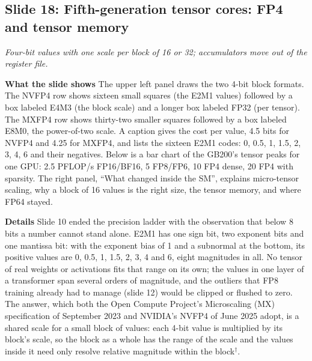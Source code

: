 \documentclass[11pt,letterpaper]{article}
\newcommand{\slide}[3]{%
  \subsection[Slide #1: #2]{Slide #1: #2}%
  {\color{muted}\itshape #3\par}\medskip}
\newcommand{\para}[1]{\medskip\noindent\textbf{#1}\quad}
\begin{document}

\slide{18}{Fifth-generation tensor cores: FP4 and tensor memory}{Four-bit values with one scale per block of 16 or 32; accumulators move out of the register file.}

\para{What the slide shows} The upper left panel draws the two 4-bit block formats. The NVFP4 row shows sixteen small squares (the E2M1 values) followed by a box labeled E4M3 (the block scale) and a longer box labeled FP32 (per tensor). The MXFP4 row shows thirty-two smaller squares followed by a box labeled E8M0, the power-of-two scale. A caption gives the cost per value, 4.5 bits for NVFP4 and 4.25 for MXFP4, and lists the sixteen E2M1 codes: 0, 0.5, 1, 1.5, 2, 3, 4, 6 and their negatives. Below is a bar chart of the GB200's tensor peaks for one GPU: 2.5 PFLOP/s FP16/BF16, 5 FP8/FP6, 10 FP4 dense, 20 FP4 with sparsity. The right panel, ``What changed inside the SM'', explains micro-tensor scaling, why a block of 16 values is the right size, the tensor memory, and where FP64 stayed.

\para{Details} Slide 10 ended the precision ladder with the observation that below 8 bits a number cannot stand alone. E2M1 has one sign bit, two exponent bits and one mantissa bit: with the exponent bias of 1 and a subnormal at the bottom, its positive values are 0, 0.5, 1, 1.5, 2, 3, 4 and 6, eight magnitudes in all. No tensor of real weights or activations fits that range on its own; the values in one layer of a transformer span several orders of magnitude, and the outliers that FP8 training already had to manage (slide 12) would be clipped or flushed to zero. The answer, which both the Open Compute Project's Microscaling (MX) specification of September 2023 and NVIDIA's NVFP4 of June 2025 adopt, is a shared scale for a small block of values: each 4-bit value is multiplied by its block's scale, so the block as a whole has the range of the scale and the values inside it need only resolve relative magnitude within the block$^\dagger$.
\end{document}

